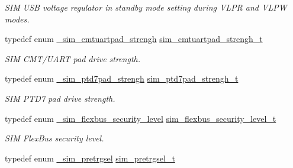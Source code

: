 \begin{DoxyCompactItemize}
\begin{DoxyCompactList}\small\item\em S\+IM U\+SB voltage regulator in standby mode setting during V\+L\+PR and V\+L\+PW modes. \end{DoxyCompactList}\item 
typedef enum \hyperlink{group__sim__hal_ga14707db7ac1696ba5f3b08dafd1f9b53}{\+\_\+sim\+\_\+cmtuartpad\+\_\+strengh} \hyperlink{group__sim__hal_gab8bdf691986599480d4d7963712d7bb5}{sim\+\_\+cmtuartpad\+\_\+strengh\+\_\+t}\hypertarget{group__sim__hal_gab8bdf691986599480d4d7963712d7bb5}{}\label{group__sim__hal_gab8bdf691986599480d4d7963712d7bb5}

\begin{DoxyCompactList}\small\item\em S\+IM C\+M\+T/\+U\+A\+RT pad drive strength. \end{DoxyCompactList}\item 
typedef enum \hyperlink{group__sim__hal_gaaef010423e66cdbe22eb1e01a1feec4b}{\+\_\+sim\+\_\+ptd7pad\+\_\+strengh} \hyperlink{group__sim__hal_ga81b5576d77b577cbc03bd57c6653b2ca}{sim\+\_\+ptd7pad\+\_\+strengh\+\_\+t}\hypertarget{group__sim__hal_ga81b5576d77b577cbc03bd57c6653b2ca}{}\label{group__sim__hal_ga81b5576d77b577cbc03bd57c6653b2ca}

\begin{DoxyCompactList}\small\item\em S\+IM P\+T\+D7 pad drive strength. \end{DoxyCompactList}\item 
typedef enum \hyperlink{group__sim__hal_ga840826a29859bd88dd2acf9e1512f936}{\+\_\+sim\+\_\+flexbus\+\_\+security\+\_\+level} \hyperlink{group__sim__hal_ga7302462a5c3005311de845c17aab6971}{sim\+\_\+flexbus\+\_\+security\+\_\+level\+\_\+t}\hypertarget{group__sim__hal_ga7302462a5c3005311de845c17aab6971}{}\label{group__sim__hal_ga7302462a5c3005311de845c17aab6971}

\begin{DoxyCompactList}\small\item\em S\+IM Flex\+Bus security level. \end{DoxyCompactList}\item 
typedef enum \hyperlink{group__sim__hal_gae8f567aabf54ce80c9dc4def4ad2fa21}{\+\_\+sim\+\_\+pretrgsel} \hyperlink{group__sim__hal_ga507a628a553fa85c2e2180012220d88e}{sim\+\_\+pretrgsel\+\_\+t}\hypertarget{group__sim__hal_ga507a628a553fa85c2e2180012220d88e}{}\label{group__sim__hal_ga507a628a553fa85c2e2180012220d88e}


\end{DoxyCompactItemize}
